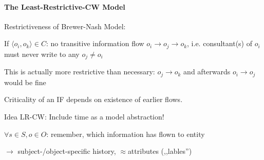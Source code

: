 \documentclass[a4paper]{article}
\begin{document}
\begin{multicols}{3}
    \paragraph{The Least-Restrictive-CW Model}

    Restrictiveness of Brewer-Nash Model:
    \begin{itemize*}
        \item If $\langle o_i,o_k\rangle \in C$: no transitive information flow $o_i \rightarrow o_j\rightarrow o_k$, i.e. consultant(s) of $o_i$ must never write to any $o_j\not=o_i$
        \item This is actually more restrictive than necessary: $o_j\rightarrow o_k$ and afterwards $o_i\rightarrow o_j$ would be fine
        \item Criticality of an IF depends on existence of earlier flows.
    \end{itemize*}

    Idea LR-CW: Include time as a model abstraction!
    \begin{itemize*}
        \item $\forall s\in S,o\in O$: remember, which information has flown to entity
        \item $\rightarrow$ subject-/object-specific history, $\approx$attributes (,,lables'')
    \end{itemize*}


\end{multicols}
\end{document}
